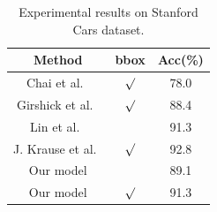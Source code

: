 \documentclass[10pt,twocolumn,letterpaper]{article}
\begin{document}
\begin{table}[t]
\centering
\begin{tabular}
{c||c|c}\hline
Method &  bbox & Acc(\%) \\\hline\hline
Chai et al.~\cite{bd25} & $\surd$  & 78.0 \\
Girshick et al.~\cite{bd24} & $\surd$ & 88.4 \\
Lin et al.~\cite{bd16} &  & 91.3 \\
J. Krause et al.~\cite{bd22} &  $\surd$ & 92.8 \\ \hline
Our model & & 89.1 \\
Our model  & $\surd$ & 91.3 \\ \hline
\end{tabular}
\caption{Experimental results on Stanford Cars dataset.}
\label{tab:car}
\end{table}
\end{document}
